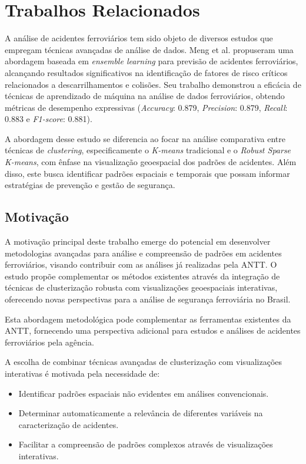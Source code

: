 \documentclass[conference]{IEEEtran}
\begin{document}
\section{Trabalhos Relacionados}

A análise de acidentes ferroviários tem sido objeto de diversos estudos que empregam técnicas avançadas de análise de dados. Meng et al. \cite{b6} propuseram uma abordagem baseada em \textit{ensemble learning} para previsão de acidentes ferroviários, alcançando resultados significativos na identificação de fatores de risco críticos relacionados a descarrilhamentos e colisões. Seu trabalho demonstrou a eficácia de técnicas de aprendizado de máquina na análise de dados ferroviários, obtendo métricas de desempenho expressivas (\textit{Accuracy}: 0.879, \textit{Precision}: 0.879, \textit{Recall}: 0.883 e \textit{F1-score}: 0.881).

A abordagem desse estudo se diferencia ao focar na análise comparativa entre técnicas de \textit{clustering}, especificamente o \textit{K-means} tradicional e o \textit{Robust Sparse K-means}, com ênfase na visualização geoespacial dos padrões de acidentes. Além disso, este busca identificar padrões espaciais e temporais que possam informar estratégias de prevenção e gestão de segurança.

\subsection{Motivação}
A motivação principal deste trabalho emerge do potencial em desenvolver metodologias avançadas para análise e compreensão de padrões em acidentes ferroviários, visando contribuir com as análises já realizadas pela ANTT. O estudo propõe complementar os métodos existentes através da integração de técnicas de clusterização robusta com visualizações geoespaciais interativas, oferecendo novas perspectivas para a análise de segurança ferroviária no Brasil.

Esta abordagem metodológica pode complementar as ferramentas existentes da ANTT, fornecendo uma perspectiva adicional para estudos e análises de acidentes ferroviários pela agência.

A escolha de combinar técnicas avançadas de clusterização com visualizações interativas é motivada pela necessidade de:
\begin{itemize}
\item Identificar padrões espaciais não evidentes em análises convencionais.
\item Determinar automaticamente a relevância de diferentes variáveis na caracterização de acidentes.
\item Facilitar a compreensão de padrões complexos através de visualizações interativas.
\end{itemize}
\end{document}
